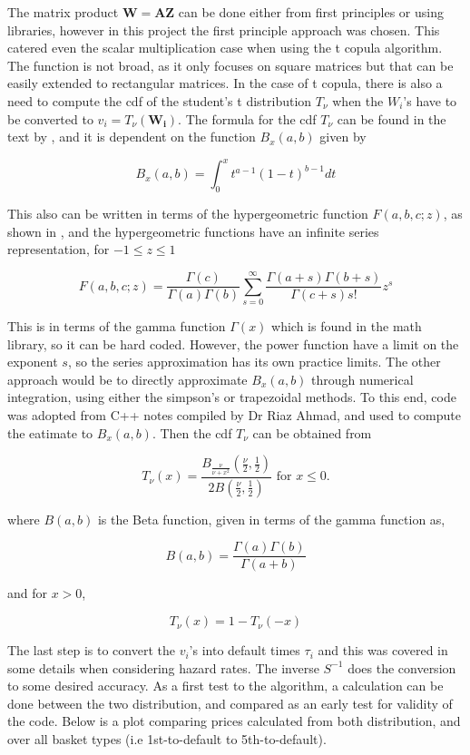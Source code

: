 \documentclass[a4paper,12pt]{article}
\begin{document}
The matrix product $\mathbf{W} = \mathbf{A}\mathbf{Z}$ can be done either from first principles or using libraries, however in this project the first principle approach was chosen. This catered even the scalar multiplication case when using the t copula algorithm. The function is not broad, as it only focuses on square matrices but that can be easily extended to rectangular matrices. 
\newline
In the case of t copula, there is also a need to compute the cdf of the student's t distribution $T_{\nu}$ when the $W_i$'s have to be converted to $v_i = T_{\nu}(\mathbf{W_i})$. The formula for the cdf $T_{\nu}$ can be found in the text by \cite{peter_jackel}, and it is dependent on the function $B_x (a, b)$ given by 

$$ B_x (a, b) = \int_0^xt^{a - 1}(1 - t)^{b - 1}dt$$

This also can be written in terms of the hypergeometric function $F(a, b, c;z)$, as shown in \cite{dlmf}, and the hypergeometric functions have an infinite series representation, for $-1 \leq z \leq 1$

$$F(a, b, c;z) = \frac{\Gamma(c)}{\Gamma(a)\Gamma(b)}\sum\limits_{s = 0}^{\infty}\frac{\Gamma(a + s)\Gamma(b + s)}{\Gamma(c + s)s!}z^s $$

This is in terms of the gamma function $\Gamma(x)$ which is found in the math library, so it can be hard coded. However, the power function have a limit on the exponent $s$, so the series approximation has its own practice limits. The other approach would be to directly approximate $B_x (a, b)$ through numerical integration, using either the simpson's or trapezoidal methods. To this end, code was adopted from C++ notes compiled by Dr Riaz Ahmad, and used to compute the eatimate to $B_x (a, b)$. Then the cdf $T_{\nu}$ can be obtained from 

\begin{equation}
T_{\nu}(x) = \frac{B_{\frac{\nu}{\nu + x^2}}(\frac{\nu}{2}, \frac{1}{2})}{2B(\frac{\nu}{2}, \frac{1}{2})}  \text{  for } x \leq 0.
\end{equation}

where $B(a, b)$ is the Beta function, given in terms of the gamma function as,

$$B(a, b) = \frac{\Gamma(a)\Gamma(b)}{\Gamma(a + b)}$$

and for $x > 0$, 

$$T_{\nu}(x) = 1 - T_{\nu}(-x)$$

The last step is to convert the $v_i$'s into default times $\tau_i$ and this was covered in some details when considering hazard rates. The inverse $S^{-1}$ does the conversion to some desired accuracy. 
\newline 
As a first test to the algorithm, a calculation can be done between the two distribution, and compared as an early test for validity of the code. Below is a plot comparing prices calculated from both distribution, and over all basket types (i.e 1st-to-default to 5th-to-default).
\end{document}
